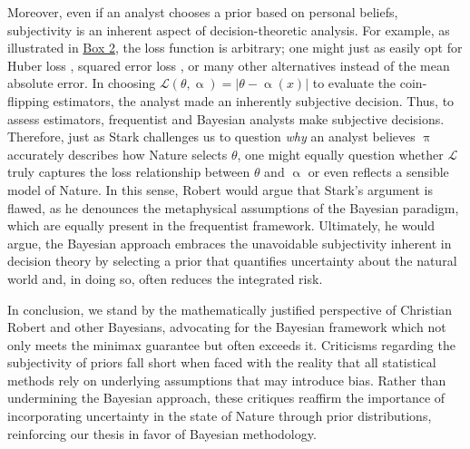 \documentclass[letterpaper,12pt]{article}
\begin{document}
Moreover, even if an analyst chooses a prior based on personal beliefs, subjectivity is an inherent aspect of decision-theoretic analysis. For example, as illustrated in \hyperref[ex:1]{Box 2}, the loss function is arbitrary; one might just as easily opt for Huber loss \cite{huber1964}, squared error loss \cite{hastie2001elements}, or many other alternatives instead of the mean absolute error. In choosing $\mathcal{L}(\theta, \upalpha) = |\theta - \upalpha(x)|$ to evaluate the coin-flipping estimators, the analyst made an inherently subjective decision. Thus, to assess estimators, frequentist and Bayesian analysts make subjective decisions. Therefore, just as Stark challenges us to question \textit{why} an analyst believes $\uppi$ accurately describes how Nature selects $\theta$, one might equally question whether $\mathcal{L}$ truly captures the loss relationship between $\theta$ and $\upalpha$ or even reflects a sensible model of Nature. In this sense, Robert would argue that Stark’s argument is flawed, as he denounces the metaphysical assumptions of the Bayesian paradigm, which are equally present in the frequentist framework. Ultimately, he would argue, the Bayesian approach embraces the unavoidable subjectivity inherent in decision theory by selecting a prior that quantifies uncertainty about the natural world and, in doing so, often reduces the integrated risk.  

In conclusion, we stand by the mathematically justified perspective of Christian Robert and other Bayesians, advocating for the Bayesian framework which not only meets the minimax guarantee but often exceeds it. Criticisms regarding the subjectivity of priors fall short when faced with the reality that all statistical methods rely on underlying assumptions that may introduce bias. Rather than undermining the Bayesian approach, these critiques reaffirm the importance of incorporating uncertainty in the state of Nature through prior distributions, reinforcing our thesis in favor of Bayesian methodology.


  
\newpage
\end{document}
